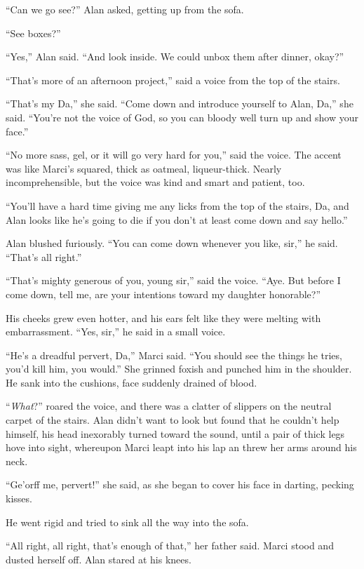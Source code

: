 \documentclass{article}
\begin{document}
``Can we go see?'' Alan asked, getting up from the sofa.

``See boxes?''

``Yes,'' Alan said.  ``And look inside.  We could unbox them after
dinner, okay?''

``That's more of an afternoon project,'' said a voice from the top of
the stairs.

``That's my Da,'' she said.  ``Come down and introduce yourself to
Alan, Da,'' she said.  ``You're not the voice of God, so you can
bloody well turn up and show your face.''

``No more sass, gel, or it will go very hard for you,'' said the
voice.  The accent was like Marci's squared, thick as oatmeal,
liqueur-thick.  Nearly incomprehensible, but the voice was kind and
smart and patient, too.

``You'll have a hard time giving me any licks from the top of the
stairs, Da, and Alan looks like he's going to die if you don't at
least come down and say hello.''

Alan blushed furiously.  ``You can come down whenever you like, sir,''
he said.  ``That's all right.''

``That's mighty generous of you, young sir,'' said the voice.  ``Aye. 
But before I come down, tell me, are your intentions toward my
daughter honorable?''

His cheeks grew even hotter, and his ears felt like they were melting
with embarrassment.  ``Yes, sir,'' he said in a small voice.

``He's a dreadful pervert, Da,'' Marci said.  ``You should see the
things he tries, you'd kill him, you would.'' She grinned foxish and
punched him in the shoulder.  He sank into the cushions, face suddenly
drained of blood.

``\textit{What}?'' roared the voice, and there was a clatter of
slippers on the neutral carpet of the stairs.  Alan didn't want to
look but found that he couldn't help himself, his head inexorably
turned toward the sound, until a pair of thick legs hove into sight,
whereupon Marci leapt into his lap an threw her arms around his neck.

``Ge'orff me, pervert!'' she said, as she began to cover his face in
darting, pecking kisses.

He went rigid and tried to sink all the way into the sofa.

``All right, all right, that's enough of that,'' her father said. 
Marci stood and dusted herself off.  Alan stared at his knees.
\end{document}
